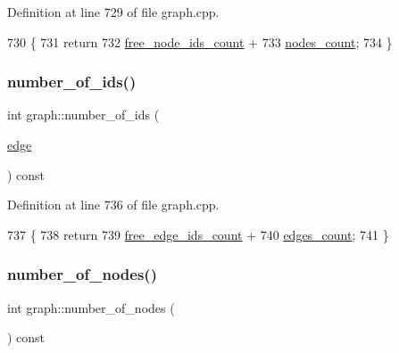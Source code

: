 Definition at line 729 of file graph.\+cpp.


\begin{DoxyCode}
730 \{
731     \textcolor{keywordflow}{return}
732     \mbox{\hyperlink{classgraph_a9480e2310fe64c3a8ad295bb3f119772}{free\_node\_ids\_count}} +
733     \mbox{\hyperlink{classgraph_a1f59223d0bcf647920963d7a661dd74a}{nodes\_count}};
734 \}
\end{DoxyCode}
\mbox{\label{classgraph_a8db97e43b31c95ac6b0bd1820aa5224b}} 
\subsubsection{\texorpdfstring{number\+\_\+of\+\_\+ids()}{number\_of\_ids()}\hspace{0.1cm}{\footnotesize\ttfamily [2/2]}}
{\footnotesize\ttfamily int graph\+::number\+\_\+of\+\_\+ids (\begin{DoxyParamCaption}\item[{\mbox{\hyperlink{classedge}{edge}}}]{ }\end{DoxyParamCaption}) const\hspace{0.3cm}{\ttfamily [inherited]}}



Definition at line 736 of file graph.\+cpp.


\begin{DoxyCode}
737 \{
738     \textcolor{keywordflow}{return}
739     \mbox{\hyperlink{classgraph_a336be547b5e0ca43b96cf00131e0e1da}{free\_edge\_ids\_count}} +
740     \mbox{\hyperlink{classgraph_af560ff4263ad165c166a46084e781b4a}{edges\_count}}; 
741 \}
\end{DoxyCode}
\mbox{\label{classgraph_a42c78e0a9f115655e3ff0efe35ebfc4e}} 
\subsubsection{\texorpdfstring{number\+\_\+of\+\_\+nodes()}{number\_of\_nodes()}}
{\footnotesize\ttfamily int graph\+::number\+\_\+of\+\_\+nodes (\begin{DoxyParamCaption}{ }\end{DoxyParamCaption}) const\hspace{0.3cm}{\ttfamily [inherited]}}

